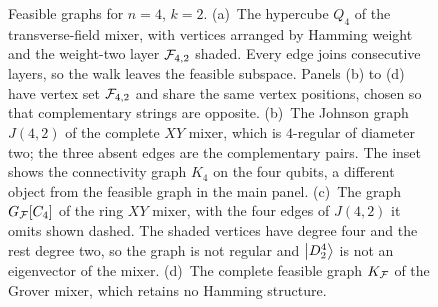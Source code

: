 \begin{figure}[t]
\begin{minipage}[t]{0.48\textwidth}
\centering
{}
\end{minipage}
\hfill
\begin{minipage}[t]{0.48\textwidth}
\centering
{}
\end{minipage}

\caption{\label{fig:graphs}Feasible graphs for $n=4$, $k=2$.
(a)~The hypercube $Q_4$ of the transverse-field mixer, with vertices arranged
by Hamming weight and the weight-two layer $\mathcal{F}_{4,2}$ shaded. Every edge joins
consecutive layers, so the walk leaves the feasible subspace. Panels (b) to
(d) have vertex set $\mathcal{F}_{4,2}$ and share the same vertex positions, chosen so
that complementary strings are opposite. (b)~The Johnson graph $J(4,2)$ of the
complete $XY$ mixer, which is $4$-regular of diameter two; the three absent
edges are the complementary pairs. The inset shows the connectivity graph
$K_4$ on the four qubits, a different object from the feasible graph in the
main panel. (c)~The graph $G_{\mathcal{F}}[C_4]$ of the ring $XY$ mixer, with the four
edges of $J(4,2)$ it omits shown dashed. The shaded vertices have degree four
and the rest degree two, so the graph is not regular and $\ket{D^4_2}$ is not
an eigenvector of the mixer. (d)~The complete feasible graph $K_{\mathcal{F}}$ of the
Grover mixer, which retains no Hamming structure.}
\end{figure}